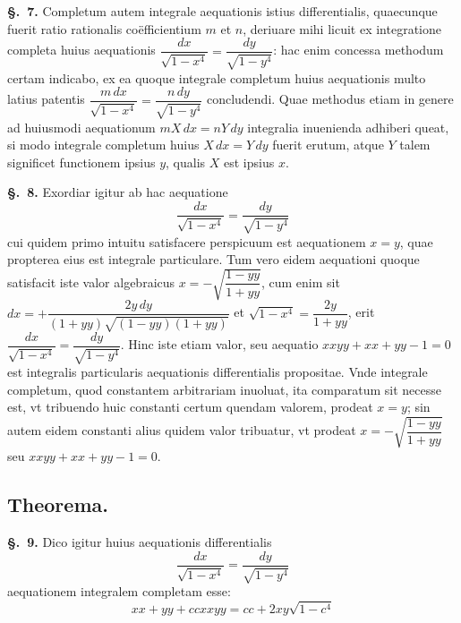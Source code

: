 \documentclass{article}
\begin{document}
\textbf{§.~7.} Completum autem integrale aequationis istius differentialis, quaecunque fuerit
ratio rationalis coëfficientium $m$ et $n$, deriuare mihi licuit ex integratione completa huius
aequationis $\dfrac{dx}{\sqrt{1-x^{4}}} = \dfrac{dy}{\sqrt{1-y^{4}}}$: hac enim concessa methodum
certam indicabo, ex ea quoque integrale completum huius aequationis multo latius patentis
$\dfrac{m\,dx}{\sqrt{1-x^{4}}} = \dfrac{n\,dy}{\sqrt{1-y^{4}}}$ concludendi. Quae methodus etiam in
genere ad huiusmodi aequationum $mX\,dx = nY\,dy$ integralia inuenienda adhiberi queat, si modo
integrale completum huius $X\,dx = Y\,dy$ fuerit erutum, atque $Y$ talem significet functionem
ipsius $y$, qualis $X$ est ipsius $x$.

\textbf{§.~8.} Exordiar igitur ab hac aequatione
\[ \frac{dx}{\sqrt{1-x^{4}}} = \frac{dy}{\sqrt{1-y^{4}}} \]
cui quidem primo intuitu satisfacere perspicuum est aequationem $x = y$, quae propterea eius est
integrale particulare. Tum vero eidem aequationi quoque satisfacit iste valor algebraicus
$x = -\sqrt{\dfrac{1-yy}{1+yy}}$, cum enim sit
$dx = +\dfrac{2y\,dy}{(1+yy)\sqrt{(1-yy)(1+yy)}}$ et $\sqrt{1-x^{4}} = \dfrac{2y}{1+yy}$, erit
$\dfrac{dx}{\sqrt{1-x^{4}}} = \dfrac{dy}{\sqrt{1-y^{4}}}$. Hinc iste etiam valor, seu aequatio
$xxyy + xx + yy - 1 = 0$ est integralis particularis aequationis differentialis propositae. Vnde
integrale completum, quod constantem arbitrariam inuoluat, ita comparatum sit necesse est, vt
tribuendo huic constanti certum quendam valorem, prodeat $x = y$; sin autem eidem constanti alius
quidem valor tribuatur, vt prodeat $x = -\sqrt{\dfrac{1-yy}{1+yy}}$ seu $xxyy + xx + yy - 1 = 0$.

\subsection*{Theorema.}
\textbf{§.~9.} Dico igitur huius aequationis differentialis
\[ \frac{dx}{\sqrt{1-x^{4}}} = \frac{dy}{\sqrt{1-y^{4}}} \]
aequationem integralem completam esse:
\[ xx + yy + ccxxyy = cc + 2xy\sqrt{1-c^{4}} \]
\end{document}
